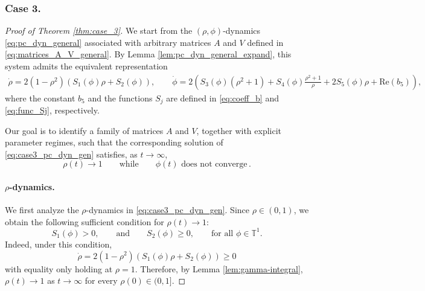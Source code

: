 \documentclass[10pt]{article}
\theoremstyle{definition}
\theoremstyle{definition}
\numberwithin{equation}{section}
\newcommand{\BBT}{\mathbb{T}}
\newcommand{\re}[1]{\mathrm{Re}\left(#1\right)}
\newcommand{\Drho}{\Dot{\rho}}
\newcommand{\Dphi}{\Dot{\phi}}
\begin{document}
\subsubsection*{Case 3.}
\label{proof:case_3}
\begin{proof}[Proof of Theorem \ref{thm:case_3}]
We start from the $(\rho, \phi)$-dynamics \eqref{eq:pc_dyn_general} associated with arbitrary matrices $A$ and $V$ defined in \eqref{eq:matrices_A_V_general}.
By Lemma \ref{lem:pc_dyn_general_expand}, this system admits the equivalent representation
\begin{equation}\label{eq:case3_pc_dyn_gen}
\begin{split}
        \Drho = 2 (1-\rho^2) \left( S_1(\phi) \rho + S_2(\phi) \right), \qquad
        \Dphi = 2 \left( S_3(\phi) (\rho^2+1) +  S_4(\phi) \frac{\rho^2 + 1}{\rho} + 2S_5(\phi) \rho + \re{b_5} \right),
    \end{split}
\end{equation}
where the constant $b_5$ and the functions $S_j$ are defined in \eqref{eq:coeff_b} and \eqref{eq:func_Sj}, respectively.

Our goal is to identify a family of matrices $A$ and $V$, together with explicit parameter regimes, such that the corresponding solution of \eqref{eq:case3_pc_dyn_gen} satisfies, as $t \rightarrow \infty$,
\[
\rho(t) \rightarrow 1 \qquad \text{while} \qquad \phi(t) \text{ does not converge} \, .
\]


\paragraph{$\rho$-dynamics.}
We first analyze the $\rho$-dynamics in \eqref{eq:case3_pc_dyn_gen}. 
Since $\rho \in (0,1)$, we obtain the following sufficient condition for $\rho(t) \rightarrow 1$: 
\begin{equation}\label{eq:suffi_cond_rho_converge}
S_1 (\phi) > 0, \qquad \text{and} \qquad S_2(\phi) \geq 0, \qquad \text{for all } \phi \in \BBT^1 .
\end{equation}
Indeed, under this condition, 
\begin{equation*}
\Drho = 2 (1-\rho^2) \left(S_1(\phi)\rho + S_2(\phi) \right) \geq 0
\end{equation*}
with equality only holding at $\rho = 1$.
Therefore, by Lemma \ref{lem:gamma-integral}, $\rho(t) \rightarrow 1$ as $t \rightarrow \infty$ for every $\rho(0) \in (0,1]$.


\end{proof}
\end{document}

